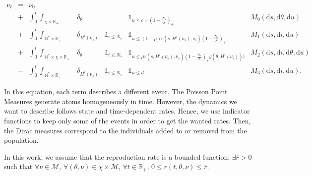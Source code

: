 \documentclass[a4paper,11pt]{article}
\newcommand{\R}{\mathbb{R}}
\newcommand{\dx}{\textrm{d}}
\begin{document}
\begin{equation}\label{processus}
\begin{array}{lllllll}
\nu_t &=& \nu_0 & &&& \\
 &+&\displaystyle  \int_{0}^t \int_{\chi \times \mathbb{R}_+} &\delta_{\theta} && \displaystyle \mathds{1}_{u \leq c\times (1-\frac{N_s}{\lambda})_+} & M_0(\dx s,\dx\theta,\dx u) \\
&+& \displaystyle \int_{0}^t \int_{\mathbb{N}^* \times \mathbb{R}_+} & \delta_{H^i(\nu_{s})} &\displaystyle \mathds{1}_{i \leq N_{s}} & \mathds{1}_{u \leq (1- \mu)r(s,H^i(\nu_{s}),\nu_s)(1-\frac{N_s}{\lambda})_+ } &  M_1(\dx s,\dx i,\dx u) \\  
&+& \displaystyle \int_{0}^t \int_{\mathbb{N}^* \times \chi \times \mathbb{R}_+} &  \delta_{\theta} & \displaystyle \mathds{1}_{i \leq N_{s}} &\displaystyle \mathds{1}_{u \leq \mu r(s,H^i(\nu_{s}),\nu_s) (1-\frac{N_s}{\lambda})_+ g\left( \theta; H^i(\nu_{s})\right))} & M_2(\dx s,\dx i,\dx\theta,\dx u) \\
&-&\displaystyle \int_{0}^t \int_{\mathbb{N}^* \times \mathbb{R}_+} &\delta_{H^i(\nu_{s})} & \displaystyle \mathds{1}_{i \leq N_{s}} & \displaystyle \mathds{1}_{u \leq d} & M_3(\dx s,\dx i,\dx u).
\end{array}
\end{equation}

In this equation, each term describes a different event. The Poisson Point Measures generate atoms homogeneously in time. However, the dynamics we want to describe follows state and time-dependent rates. Hence, we use indicator functions to keep only some of the events in order to get the wanted rates. Then, the Dirac measures correspond to the individuals added to or removed from the population. \par 

In this work, we assume that the reproduction rate is a bounded function: $\exists \overline{r}>0$ such that $\forall \nu \in \mathcal{M}$, $\forall (\theta,\nu) \in \chi \times \mathcal{M}$, $\forall t\in \R_+$, $0\leq r(t,\theta,\nu) \leq \overline{r}$.
\end{document}
